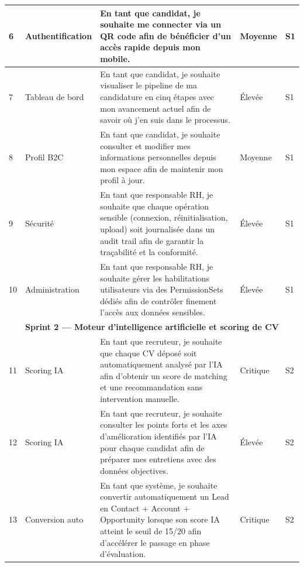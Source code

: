\begin{longtable}{|p{0.6cm}|p{2.5cm}|p{7.5cm}|p{1.3cm}|p{1.3cm}|}
6 & Authentification & En tant que candidat, je souhaite me connecter via un QR code afin de bénéficier d'un accès rapide depuis mon mobile. & Moyenne & S1 \\
\hline

7 & Tableau de bord & En tant que candidat, je souhaite visualiser le pipeline de ma candidature en cinq étapes avec mon avancement actuel afin de savoir où j'en suis dans le processus. & Élevée & S1 \\
\hline

8 & Profil B2C & En tant que candidat, je souhaite consulter et modifier mes informations personnelles depuis mon espace afin de maintenir mon profil à jour. & Moyenne & S1 \\
\hline

9 & Sécurité & En tant que responsable RH, je souhaite que chaque opération sensible (connexion, réinitialisation, upload) soit journalisée dans un audit trail afin de garantir la traçabilité et la conformité. & Élevée & S1 \\
\hline

10 & Administration & En tant que responsable RH, je souhaite gérer les habilitations utilisateurs via des PermissionSets dédiés afin de contrôler finement l'accès aux données sensibles. & Élevée & S1 \\
\hline

\multicolumn{5}{|c|}{\cellcolor{green!10}\textbf{Sprint 2 --- Moteur d'intelligence artificielle et scoring de CV}} \\
\hline

11 & Scoring IA & En tant que recruteur, je souhaite que chaque CV déposé soit automatiquement analysé par l'IA afin d'obtenir un score de matching et une recommandation sans intervention manuelle. & Critique & S2 \\
\hline

12 & Scoring IA & En tant que recruteur, je souhaite consulter les points forts et les axes d'amélioration identifiés par l'IA pour chaque candidat afin de préparer mes entretiens avec des données objectives. & Élevée & S2 \\
\hline

13 & Conversion auto & En tant que système, je souhaite convertir automatiquement un Lead en Contact + Account + Opportunity lorsque son score IA atteint le seuil de 15/20 afin d'accélérer le passage en phase d'évaluation. & Critique & S2 \\
\hline


\end{longtable}
